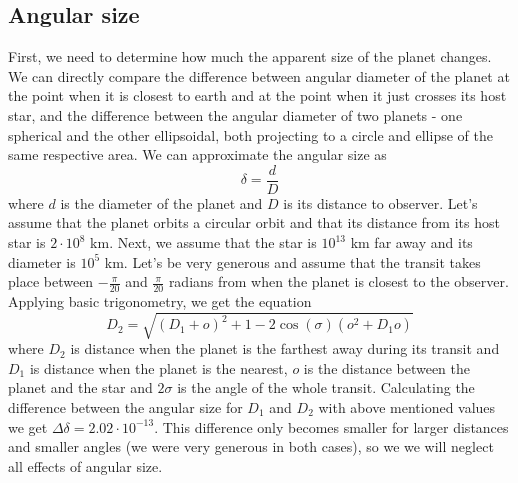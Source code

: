\documentclass[10pt]{article}
\numberwithin{equation}{subsection}
\begin{document}
\subsection{Angular size}
First, we need to determine how much the apparent size of the planet changes.
We can directly compare the difference between angular diameter of the planet at the 
point when it is closest to earth and at the point when it just crosses its host star,
and the difference between the angular diameter of two planets - one spherical and the
other ellipsoidal, both projecting to a circle and ellipse of the same respective area.
We can approximate the angular size as
\begin{equation}
  \delta = \frac{d}{D}
  \label{eq:angular-size}
\end{equation}
where $d$ is the diameter of the planet and $D$ is its distance to observer.
Let's assume that the planet orbits a circular orbit and that its distance from its
host star is $2\cdot10^8$ km. Next, we assume that the star is $10^{13}$ km far away
and its diameter is $10^5$ km. Let's be very generous and assume that the transit takes
place between $-\frac{\pi}{20}$ and $\frac{\pi}{20}$ radians from when the planet is
closest to the observer. Applying basic trigonometry, we get the equation
\begin{equation}
  D_2 = \sqrt{(D_1 + o)^2 + 1 -2 \cos(\sigma)(o^2 + D_1o)}
  \label{eq:D2}
\end{equation}
where $D_2$ is distance when the planet is the farthest away during its transit and $D_1$
is distance when the planet is the nearest, $o$ is the distance between the planet and
the star and $2\sigma$ is the angle of the whole transit. Calculating the difference
between the angular size for $D_1$ and $D_2$ with above mentioned values we get
$\Delta\delta = 2.02\cdot10^{-13}$.
This difference only becomes smaller for larger distances and smaller angles (we were very
generous in both cases), so we we will neglect all effects of angular size.
\end{document}
